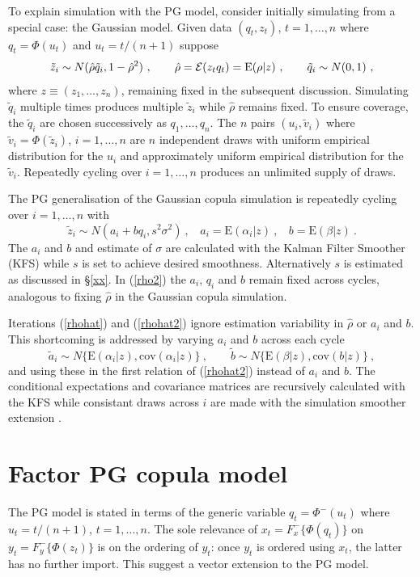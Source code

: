\documentclass[authoryear]{elsarticle}
\newcommand{\E}{\mathrm{E}}
\newcommand{\cov}{\mathrm{cov}}
\newcommand{\Ex}{{\cal E}}
\newcommand{\eref}[1]{(\ref{#1})}
\newcommand{\sref}[1]{\S\ref{#1}}
\newcommand{\cq}{\ , \qquad}
\newcommand{\be}[1]{\begin{equation}\label{#1}}
\newcommand{\ee}{\end{equation}}
\begin{document}
To explain simulation with the PG model, consider initially  simulating from a special case: the Gaussian model.   Given data $(q_t,z_t)$, $t=1,\ldots,n$ where
$q_t=\Phi(u_t)$ and $u_t=t/(n+1)$ suppose 
\be{rhohat}
\tilde z_i\sim N(\hat\rho \tilde q_i,1-\hat\rho^2)\cq \hat\rho=\Ex(z_tq_t) = \E(\rho|  z)\cq \tilde q_i\sim N(0,1)\ ,
\ee
where $z\equiv(z_1,\ldots,z_n)$,  remaining fixed in the subsequent discussion.
Simulating $\tilde q_i$ multiple times produces multiple $\tilde z_i$ while $\hat\rho$  remains fixed.   To ensure  coverage, the $\tilde q_i$ are chosen successively as $q_1,\ldots,q_n$.   The  $n$ pairs $(u_i, \tilde v_i)$ where $\tilde v_i=\Phi(\tilde z_i)$, $i=1,\ldots,n$  are $n$ independent draws with   uniform  empirical distribution for the $u_i$ and approximately uniform empirical distribution for the $\tilde v_i$.   Repeatedly cycling over $i=1,\ldots,n$  produces an unlimited supply of  draws.

The PG generalisation of the Gaussian copula simulation  is repeatedly cycling over  $i=1,\ldots,n$ with 
\be{rhohat2}
\tilde z_i\sim N(a_i+bq_i, s^2\sigma^2)\ , \ \ \ \  a_i=\E(\alpha_i|  z)\ , \ \ \ \ b=\E(\beta|  z)\ .
\ee
The $a_i$ and $b$ and estimate of $\sigma$ are calculated with the Kalman Filter Smoother (KFS)  \citep{DeJong:91a} while $s$ is set to achieve desired smoothness.  Alternatively $s$ is estimated as discussed in \sref{xx}.  In  \eref{rho2} the $a_i$, $q_i$  and $b$ remain fixed across cycles, analogous to fixing $\hat \rho$  in the  Gaussian copula simulation.   

Iterations \eref{rhohat} and \eref{rhohat2}  ignore  estimation variability in $\hat\rho$ or $a_i$ and $b$.  This shortcoming is addressed by varying  $a_i$ and $b$  across  each cycle 
$$
\tilde a_i \sim N\{\E(\alpha_i|  z),\cov(\alpha_i|  z)\}\cq  \tilde b\sim N\{\E(\beta|  z),\cov(b|  z)\}\ ,
$$
and using these  in the first relation of \eref{rhohat2}  instead of $a_i$ and $b$.
The conditional expectations and covariance matrices are recursively calculated with the KFS while consistant  draws  across $i$  are made with the 
simulation smoother extension  \citep{DeJong&Shephard:95}. 

\section{Factor PG copula model}

The PG  model is stated in terms of the generic variable $q_t=\Phi^-(u_t)$ where $u_t=t/(n+1)$, $t=1,\ldots,n$.   The sole relevance of $x_t=F_x^-\{\Phi(q_t)\}$   on  $y_t=F^-_y\{\Phi(z_t)\}$ is on  the ordering  of $y_t$: once  $y_t$  is ordered using $x_t$, the latter has no further import.  This suggest a vector extension  to the PG model.
\end{document}
